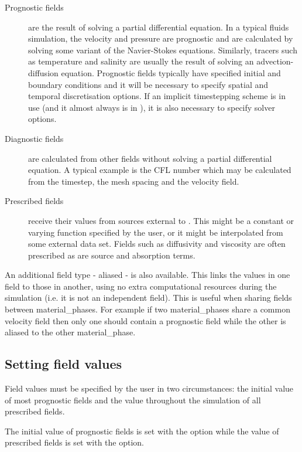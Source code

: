 \begin{description}
\item[Prognostic fields] are the result of solving a partial differential
  equation. In a typical fluids simulation, the velocity and pressure are
  prognostic and are calculated by solving some variant of the Navier-Stokes
  equations. Similarly, tracers such as temperature and salinity are usually
  the result of solving an advection-diffusion equation. Prognostic fields
  typically have specified initial and boundary conditions and it will be
  necessary to specify spatial and temporal discretisation options. If an
  implicit timestepping scheme is in use (and it almost always is in
  \fluidity), it is also necessary to specify solver options. 
\item[Diagnostic fields] are calculated from other fields without solving a
  partial differential equation. A typical example is the CFL number which
  may be calculated from the timestep, the mesh spacing and the velocity
  field. 
\item[Prescribed fields] receive their values from sources external to
  \fluidity. This might be a constant or varying function specified by the
  user, or it might be interpolated from some external data set. Fields such
  as diffusivity and viscosity are often prescribed as are source and
  absorption terms.
\end{description}

An additional field type - aliased - is also available.  This links the values in one field to those in another, using no extra computational resources during the simulation (i.e. it is not an independent field).  This is useful when sharing fields between material\_phases.  For example if two material\_phases share a common velocity field then only one should contain a prognostic field while the other is aliased to the other material\_phase.

\subsection{Setting field values}\label{Sect:setting_field_values}
Field values must be specified by the user in two circumstances: the initial
value of most prognostic fields and the value throughout the simulation of
all prescribed fields. 

The initial value of prognostic fields is set with the
 option while the value of
prescribed fields is set with the  option.


